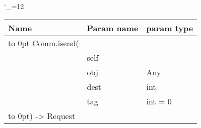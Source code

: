 \begingroup \catcode`\_=12 \tt
\begin{tabular}{lll}
\toprule
\textrm{Name}&\textrm{Param name}&\textrm{param type}\\
\midrule
\hbox to 0pt {Comm.isend(\hss}\\
& self\\
& obj & Any\\
& dest & int\\
& tag & int = 0\\
\hbox to 0pt{) -> Request\hss}\\
\bottomrule
\end{tabular}
\endgroup
